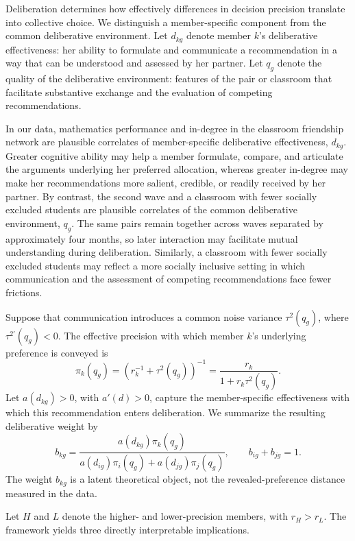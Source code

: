 \documentclass[11 pt]{article}
\begin{document}
Deliberation determines how effectively differences in decision precision translate into collective choice. We distinguish a member-specific component from the common deliberative environment. Let $d_{kg}$ denote member $k$'s deliberative effectiveness: her ability to formulate and communicate a recommendation in a way that can be understood and assessed by her partner. Let $q_g$ denote the quality of the deliberative environment: features of the pair or classroom that facilitate substantive exchange and the evaluation of competing recommendations.

In our data, mathematics performance and in-degree in the classroom friendship network are plausible correlates of member-specific deliberative effectiveness, $d_{kg}$. Greater cognitive ability may help a member formulate, compare, and articulate the arguments underlying her preferred allocation, whereas greater in-degree may make her recommendations more salient, credible, or readily received by her partner. By contrast, the second wave and a classroom with fewer socially excluded students are plausible correlates of the common deliberative environment, $q_g$. The same pairs remain together across waves separated by approximately four months, so later interaction may facilitate mutual understanding during deliberation. Similarly, a classroom with fewer socially excluded students may reflect a more socially inclusive setting in which communication and the assessment of competing recommendations face fewer frictions.

Suppose that communication introduces a common noise variance $\tau^2(q_g)$, where $\tau^{2\prime}(q_g)<0$. The effective precision with which member $k$'s underlying preference is conveyed is
\begin{equation}
    \pi_k(q_g)=\left(r_k^{-1}+\tau^2(q_g)\right)^{-1}
    =\frac{r_k}{1+r_k\tau^2(q_g)}.
    \label{eq:effective_precision}
\end{equation}
Let $a(d_{kg})>0$, with $a'(d)>0$, capture the member-specific effectiveness with which this recommendation enters deliberation. We summarize the resulting deliberative weight by
\begin{equation}
    b_{kg}=\frac{a(d_{kg})\pi_k(q_g)}{a(d_{ig})\pi_i(q_g)+a(d_{jg})\pi_j(q_g)},
    \qquad b_{ig}+b_{jg}=1.
    \label{eq:deliberative_weight}
\end{equation}
The weight $b_{kg}$ is a latent theoretical object, not the revealed-preference distance measured in the data.

Let $H$ and $L$ denote the higher- and lower-precision members, with $r_H>r_L$. The framework yields three directly interpretable implications.
\end{document}
